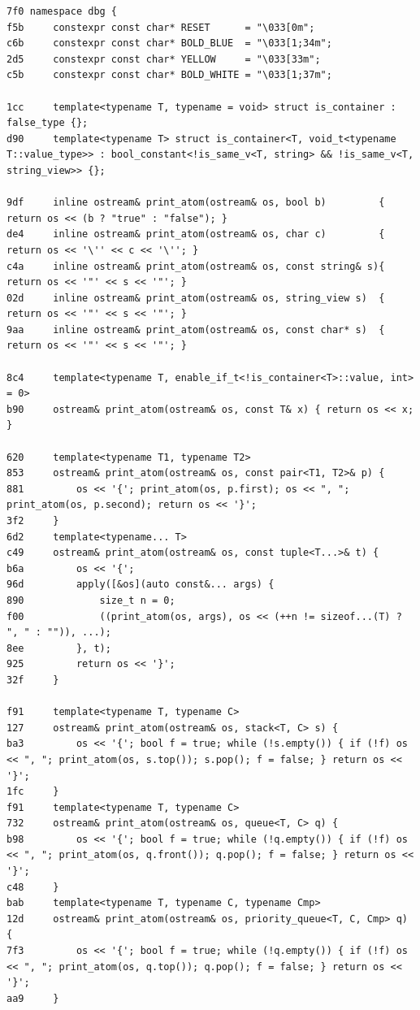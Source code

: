 \documentclass[11pt, a4paper, twoside]{article}
\begin{document}
{\begin{lstlisting}
7f0 namespace dbg {
f5b     constexpr const char* RESET      = "\033[0m";
c6b     constexpr const char* BOLD_BLUE  = "\033[1;34m";
2d5     constexpr const char* YELLOW     = "\033[33m";
c5b     constexpr const char* BOLD_WHITE = "\033[1;37m";
    
1cc     template<typename T, typename = void> struct is_container : false_type {};
d90     template<typename T> struct is_container<T, void_t<typename T::value_type>> : bool_constant<!is_same_v<T, string> && !is_same_v<T, string_view>> {};
    
9df     inline ostream& print_atom(ostream& os, bool b)         { return os << (b ? "true" : "false"); }
de4     inline ostream& print_atom(ostream& os, char c)         { return os << '\'' << c << '\''; }
c4a     inline ostream& print_atom(ostream& os, const string& s){ return os << '"' << s << '"'; }
02d     inline ostream& print_atom(ostream& os, string_view s)  { return os << '"' << s << '"'; }
9aa     inline ostream& print_atom(ostream& os, const char* s)  { return os << '"' << s << '"'; }
    
8c4     template<typename T, enable_if_t<!is_container<T>::value, int> = 0>
b90     ostream& print_atom(ostream& os, const T& x) { return os << x; }
    
620     template<typename T1, typename T2>
853     ostream& print_atom(ostream& os, const pair<T1, T2>& p) {
881         os << '{'; print_atom(os, p.first); os << ", "; print_atom(os, p.second); return os << '}';
3f2     }
6d2     template<typename... T>
c49     ostream& print_atom(ostream& os, const tuple<T...>& t) {
b6a         os << '{';
96d         apply([&os](auto const&... args) {
890             size_t n = 0;
f00             ((print_atom(os, args), os << (++n != sizeof...(T) ? ", " : "")), ...);
8ee         }, t);
925         return os << '}';
32f     }
    
f91     template<typename T, typename C>
127     ostream& print_atom(ostream& os, stack<T, C> s) {
ba3         os << '{'; bool f = true; while (!s.empty()) { if (!f) os << ", "; print_atom(os, s.top()); s.pop(); f = false; } return os << '}';
1fc     }
f91     template<typename T, typename C>
732     ostream& print_atom(ostream& os, queue<T, C> q) {
b98         os << '{'; bool f = true; while (!q.empty()) { if (!f) os << ", "; print_atom(os, q.front()); q.pop(); f = false; } return os << '}';
c48     }
bab     template<typename T, typename C, typename Cmp>
12d     ostream& print_atom(ostream& os, priority_queue<T, C, Cmp> q) {
7f3         os << '{'; bool f = true; while (!q.empty()) { if (!f) os << ", "; print_atom(os, q.top()); q.pop(); f = false; } return os << '}';
aa9     }
    

\end{lstlisting}}
\end{document}
